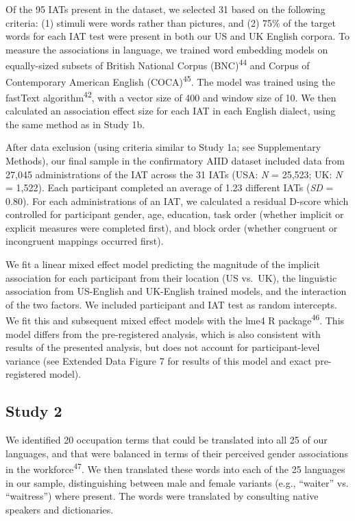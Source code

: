 \documentclass[11pt]{wlscirep}
\begin{document}
Of the 95 IATs present in the dataset, we selected 31 based on the following criteria: (1) stimuli were words rather than pictures, and (2) 75\% of the target words for each IAT test were present in both our US and UK English corpora. To measure the associations in language, we trained word embedding models on equally-sized subsets of British National Corpus (BNC)\textsuperscript{44} and Corpus of Contemporary American English (COCA)\textsuperscript{45}. The model was trained using the fastText algorithm\textsuperscript{42}, with a vector size of 400 and  window size of 10. We then calculated an association effect size for each IAT in each English dialect, using the same method as in Study 1b.


After data exclusion (using criteria similar to Study 1a; see Supplementary Methods), our final sample
in the confirmatory AIID dataset included data from 27,045 administrations of the IAT across the 31 IATs (USA: \emph{N} = 25,523; UK: \emph{N} = 1,522). Each participant
completed an average of 1.23 different IATs (\emph{SD} = 0.80). For each administrations of an IAT, we calculated a residual D-score which controlled for participant gender, age, education, task order (whether implicit or explicit measures were completed first), and block order (whether congruent or incongruent mappings occurred first).

We fit a linear mixed effect model predicting the magnitude of the implicit association for each participant from their location (US vs.\ UK), the linguistic association from US-English and UK-English trained models, and the interaction of the two factors. We included participant and IAT test as random intercepts. We fit this and subsequent mixed effect models with the lme4 R package\textsuperscript{46}. This model differs from the pre-registered analysis, which is also consistent with results of the presented analysis, but does not account for participant-level variance (see Extended Data Figure 7 for results of this model and exact pre-registered model).


\subsection*{Study 2}

We identified 20 occupation terms that could be translated into  all 25 of our languages, and that were balanced in terms of their perceived gender associations in the workforce\textsuperscript{47}. We
then translated these words into each of the 25 languages in our sample,
distinguishing between male and female variants (e.g., \enquote{waiter}
vs. \enquote{waitress}) where present. The words were translated by
consulting native speakers and dictionaries.
\end{document}
